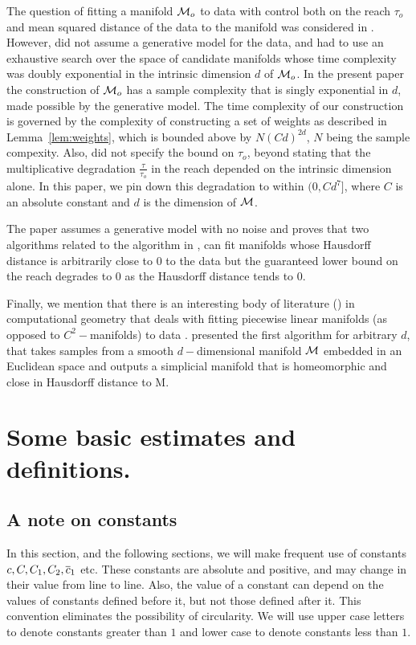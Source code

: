 \documentclass[final, 12pt]{colt2018} %
\begin{document}
The question of fitting a manifold $\mathcal M_o$ to data with control both on the reach $\tau_o$ and mean squared distance of the data to the manifold was considered in \cite{FMN}. However, \cite{FMN} did not assume a generative model for the data, and had to use an exhaustive search over the space of candidate manifolds whose time complexity was doubly exponential in the intrinsic dimension $d$ of $\mathcal M_o$. In the present paper the construction of $\mathcal M_o$ has a sample complexity that is singly exponential in $d$, made possible by the generative model. The time complexity of our construction is governed by the complexity of constructing a set of weights as described in Lemma~\ref{lem:weights}, which is bounded above by $N(Cd)^{2d}$, $N$ being the sample compexity. Also, \cite{FMN} did not specify the bound on $\tau_o$, beyond stating that the multiplicative degradation $\frac{\tau}{\tau_o}$ in the reach depended on the intrinsic dimension alone. In this paper, we pin down this degradation to within $(0, C d^7]$, where $C$ is an absolute constant and $d$ is the dimension of $\mathcal M$.

 The paper \cite{Kitty} assumes a generative model with no noise and proves that two algorithms related to the algorithm in  \cite{FMN}, 
can fit manifolds whose Hausdorff distance is arbitrarily close to $0$ to the data but the guaranteed lower bound on the  reach degrades to $0$  as the Hausdorff distance tends to $0$. 


Finally, we mention that there is an interesting body of literature (\cite{Boissonnat, Cheng}) in computational geometry that deals with fitting piecewise linear manifolds (as opposed to $C^2-$manifolds) to data  . \cite{Cheng} presented the first  algorithm for arbitrary $d$, that takes samples from a smooth $d-$dimensional
manifold $\mathcal M$ embedded in an Euclidean space and outputs a simplicial manifold that is
homeomorphic and close in Hausdorff distance to M. 

\section{Some basic estimates and definitions.}


\subsection{A note on  constants}
In this section, and the following sections, we will make frequent use of constants $c, C, C_1, C_2, \overline{c}_1$ etc. These constants are absolute and positive, and may change in their value from line to line.
   Also, the value of a constant can depend on the values of constants defined before it, but not those defined after it. This convention  eliminates the possibility of circularity. We will use upper case letters to denote constants greater than $1$ and lower case to denote constants less than $1$.
\end{document}
